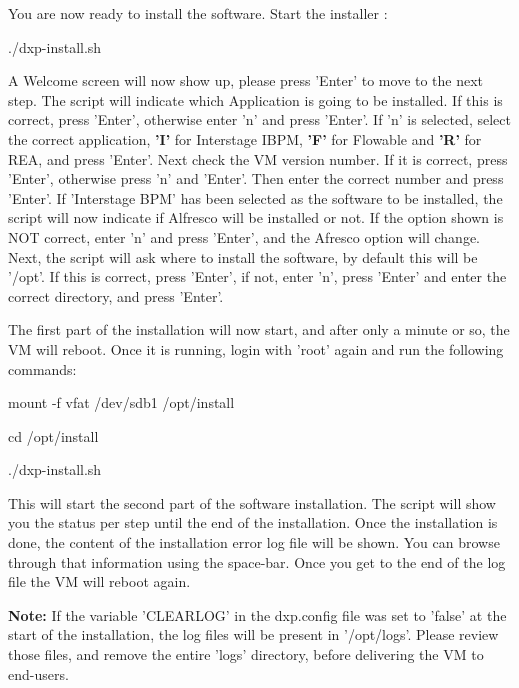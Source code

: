 \begin{myindent}
\noindent You are now ready to install the software. Start the installer :
\newline

\begin{urlboxstyle}
./dxp-install.sh
\end{urlboxstyle}
\newline

\noindent A Welcome screen will now show up, please press 'Enter' to move to the next step.
The script will indicate which Application is going to be installed. If this is correct, press 'Enter', otherwise enter 'n' and press 'Enter'.
If 'n' is selected, select the correct application, \textbf{'I'} for Interstage IBPM, \textbf{'F'} for Flowable and \textbf{'R'} for REA, and press 'Enter'.
Next check the VM version number. If it is correct, press 'Enter', otherwise press 'n' and 'Enter'. Then enter the correct number and press 'Enter'.
If 'Interstage BPM' has been selected as the software to be installed, the script will now indicate if Alfresco will be installed or not. If the option shown is NOT correct,
enter 'n' and press 'Enter', and the Afresco option will change.
Next, the script will ask where to install the software, by default this will be '/opt'. If this is correct, press 'Enter', if not, enter 'n', press 'Enter' and enter the correct directory,
and press 'Enter'.
\newline

\noindent The first part of the installation will now start, and after only a minute or so, the VM will reboot. Once it is running, login with 'root' again and run the following commands:
\newline

\begin{urlboxstyle}
mount -f vfat /dev/sdb1 /opt/install
\end{urlboxstyle}
\newline

\begin{urlboxstyle}
cd /opt/install
\end{urlboxstyle}
\newline

\begin{urlboxstyle}
./dxp-install.sh
\end{urlboxstyle}
\newline

\noindent This will start the second part of the software installation. The script will show you the status per step until the end of the installation.
Once the installation is done, the content of the installation error log file will be shown. You can browse through that information using the space-bar. Once you get to the end of the log file
the VM will reboot again.
\newline

\noindent \textbf{Note:} If the variable 'CLEARLOG' in the dxp.config file was set to 'false' at the start of the installation, the log files will be present in '/opt/logs'. Please review those files,
and remove the entire 'logs' directory, before delivering the VM to end-users.
\end{myindent}

